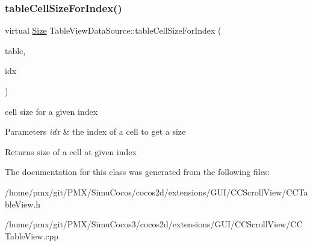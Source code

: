 \subsubsection{\texorpdfstring{table\+Cell\+Size\+For\+Index()}{tableCellSizeForIndex()}\hspace{0.1cm}{\footnotesize\ttfamily [2/2]}}
{\footnotesize\ttfamily virtual \hyperlink{classSize}{Size} Table\+View\+Data\+Source\+::table\+Cell\+Size\+For\+Index (\begin{DoxyParamCaption}\item[{\hyperlink{classTableView}{Table\+View} $\ast$}]{table,  }\item[{ssize\+\_\+t}]{idx }\end{DoxyParamCaption})\hspace{0.3cm}{\ttfamily [virtual]}}

cell size for a given index


\begin{DoxyParams}{Parameters}
{\em idx} & the index of a cell to get a size \\
\hline
\end{DoxyParams}
\begin{DoxyReturn}{Returns}
size of a cell at given index 
\end{DoxyReturn}


The documentation for this class was generated from the following files\+:\begin{DoxyCompactItemize}
\item 
/home/pmx/git/\+P\+M\+X/\+Simu\+Cocos/cocos2d/extensions/\+G\+U\+I/\+C\+C\+Scroll\+View/C\+C\+Table\+View.\+h\item 
/home/pmx/git/\+P\+M\+X/\+Simu\+Cocos3/cocos2d/extensions/\+G\+U\+I/\+C\+C\+Scroll\+View/C\+C\+Table\+View.\+cpp\end{DoxyCompactItemize}
